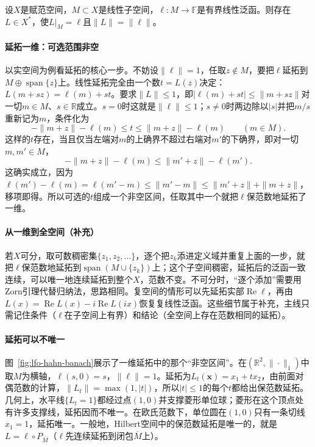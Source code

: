 \begin{theorem}
\label{thm:lfo-hahn-banach}
设$X$是赋范空间，$M\subset X$是线性子空间，$\ell:M\to\mathbb F$是有界线性泛函。则存在$L\in X^*$，使$L|_M=\ell$且$\|L\|=\|\ell\|$。
\end{theorem}

\paragraph{延拓一维：可选范围非空}
以实空间为例看延拓的核心一步。不妨设$\|\ell\|=1$，任取$z\notin M$，要把$\ell$延拓到$M\oplus\operatorname{span}\{z\}$上。线性延拓完全由一个数$t=L(z)$决定：$L(m+sz)=\ell(m)+st$。要求$\|L\|\leq1$，即$|\ell(m)+st|\leq\|m+sz\|$对一切$m\in M$、$s\in\mathbb R$成立。$s=0$时这就是$\|\ell\|\leq1$；$s\neq0$时两边除以$|s|$并把$m/s$重新记为$m$，条件化为
\[
 -\|m+z\|-\ell(m)\leq t\leq\|m+z\|-\ell(m)\qquad(m\in M).
\]
这样的$t$存在，当且仅当左端对$m$的上确界不超过右端对$m'$的下确界，即对一切$m,m'\in M$，
\[
 -\|m+z\|-\ell(m)\leq\|m'+z\|-\ell(m') .
\]
这确实成立，因为$\ell(m')-\ell(m)=\ell(m'-m)\leq\|m'-m\|\leq\|m'+z\|+\|m+z\|$，移项即得。所以可选的$t$组成一个非空区间，任取其中一个就把$\ell$保范数地延拓了一维。

\paragraph{从一维到全空间（补充）}
若$X$可分，取可数稠密集$\{z_1,z_2,\ldots\}$，逐个把$z_k$添进定义域并重复上面的一步，就把$\ell$保范数地延拓到$\operatorname{span}(M\cup\{z_k\})$上；这个子空间稠密，延拓后的泛函一致连续，可以唯一地连续延拓到整个$X$，范数不变。不可分时，“逐个添加”需要用Zorn引理代替归纳法，思路相同。复空间的情形可以先延拓实部$\operatorname{Re}\ell$，再由$L(x)=\operatorname{Re}L(x)-i\operatorname{Re}L(ix)$恢复复线性泛函。这些细节属于补充，主线只需记住条件（$\ell$在子空间上有界）和结论（全空间上存在范数相同的延拓）。

\paragraph{延拓可以不唯一}
图~\ref{fig:lfo-hahn-banach}展示了一维延拓中的那个“非空区间”。在$(\mathbb R^2,\|\cdot\|_1)$中取$M$为横轴，$\ell(s,0)=s$，$\|\ell\|=1$。延拓为$L_t(\bm x)=x_1+tx_2$，由前面对偶范数的计算，$\|L_t\|=\max(1,|t|)$，所以$|t|\leq1$的每个$t$都给出保范数延拓。几何上，水平线$\{L_t=1\}$都经过点$(1,0)$并支撑菱形单位球；菱形在这个顶点处有许多支撑线，延拓因而不唯一。在欧氏范数下，单位圆在$(1,0)$只有一条切线$x_1=1$，延拓唯一。一般地，Hilbert空间中的保范数延拓是唯一的，就是$L=\ell\circ P_{\overline M}$（$\ell$先连续延拓到闭包$\overline M$上）。

